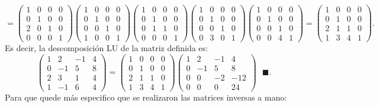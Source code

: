 \documentclass[11pt,letterpaper]{article}
\newcommand{\finf}{\blacksquare.}
\begin{document}
\begin{enumerate}
$$=\left(\begin{array}{cccc}
1&0&0&0\\
0&1&0&0\\
2&0&1&0\\
0&0&0&1
\end{array}\right)\left(\begin{array}{cccc}
1&0&0&0\\
0&1&0&0\\
0&0&1&0\\
1&0&0&1
\end{array} \right)\left(\begin{array}{cccc}
1&0&0&0\\
0&1&0&0\\
0&1&1&0\\
0&0&0&1
\end{array} \right)\left(\begin{array}{cccc}
1&0&0&0\\
0&1&0&0\\
0&0&1&0\\
0&3&0&1
\end{array} \right)\left(\begin{array}{cccc}
1&0&0&0\\
0&1&0&0\\
0&0&1&0\\
0&0&4&1
\end{array} \right)=\left(
\begin{array}{rrrr}
 1 &  0 & 0 &  0\\
 0 &  1 & 0 &  0\\
 2 &  1 & 1 &  0\\
 1 &  3 & 4 &  1
\end{array}\right).$$
Es decir, la descomposición LU de la matriz definida es:
$$
\left(\begin{array}{rrrr}
 1 &  2 & -1 & 4\\
 0 & -1 &  5 & 8\\
 2 &  3 &  1 & 4\\
 1 & -1 &  6 & 4
\end{array} \right)=\left(
\begin{array}{rrrr}
 1 &  0 & 0 &  0\\
 0 &  1 & 0 &  0\\
 2 &  1 & 1 &  0\\
 1 &  3 & 4 &  1
\end{array}\right)\left(
\begin{array}{rrrr}
 1 &  2 & -1 &   4\\
 0 & -1 &  5 &   8\\
 0 &  0 & -2 & -12\\
 0 &  0 &  0 & 24
\end{array}
\right) \ \ \ \finf
$$
Para que quede más especifico que se realizaron las matrices inversas a mano:


\end{enumerate}
\end{document}
